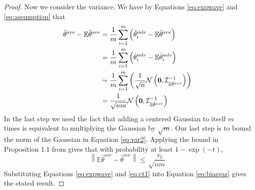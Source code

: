 \documentclass[twoside]{article}
\DeclareMathOperator*{\tr}{tr}
\newcommand{\zero}{\text{\textbf{0}}}
\newcommand{\E}{\mathbb{E}}
\newcommand{\w}{\theta}
\newcommand{\wave}{\hat\w^{ave}}
\newcommand{\wtave}{\E\hat\w^{ave}}
\newcommand{\wmle}{\hat\w^{mle}}
\newcommand{\I}{\mathcal I}
\newcommand{\normal}[2]{\ensuremath{\mathcal{N}\left({{#1}},{{#2}}\right)}}
\newcommand{\ltwo}[1]{{\left\lVert {#1} \right\rVert}}
\begin{document}
\begin{proof}
Now we consider the variance.
We have by Equations \ref{eq:expwave} and \ref{eq:assumption} that
\begin{align}
\wave-\E\wave
&=
\frac{1}{m}\sum_{i=1}^m\left(\wmle_i-\E\wave\right)
\label{eq:var1}
\\&=
\frac{1}{m}\sum_{i=1}^m\left(\wmle_i-\E\wmle_i\right)
\\&\sim
\frac{1}{m}\sum_{i=1}^m\left(\frac{1}{\sqrt n}\normal\zero{\I^{-1}_{\E\wave}}\right)
\\&=
\frac{1}{\sqrt {nm}}\normal\zero{\I^{-1}_{\E\wave}}
\label{eq:var2}
\end{align}
In the last step we used the fact that adding a centered Gaussian to itself $m$ times is equivalent to multiplying the Gaussian by $\sqrt{m}$.
Our last step is to bound the norm of the Gaussian in Equation \ref{eq:var2}.
Applying the bound in Proposition 1.1 from \cite{hsu2012tail} gives that with probability at least $1-\exp(-t)$,
\begin{equation}
\ltwo{\E\wave-\wave} \le \sqrt\frac{v_t}{nm}
\label{eq:ct1}
\end{equation}
Substituting Equations \ref{eq:expwave} and \ref{eq:ct1} into Equation \ref{eq:biasvar} gives the stated result.
\end{proof}
\end{document}
